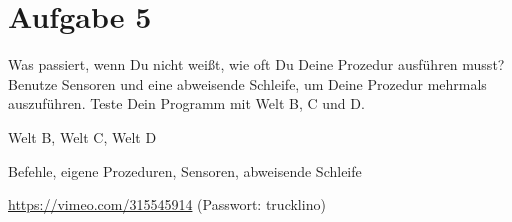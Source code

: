 \section{Aufgabe 5}
\label{sec:exercises:5}

Was passiert, wenn Du nicht weißt, wie oft Du Deine Prozedur ausführen musst? Benutze Sensoren und eine abweisende Schleife, um Deine Prozedur mehrmals auszuführen. Teste Dein Programm mit Welt B, C und D.

\begin{description}[noitemsep]
  \item[Welt wählen:] Welt B, Welt C, Welt D
  \item[Du brauchst:] Befehle, eigene Prozeduren, Sensoren, abweisende Schleife
  \item[Video:] \url{https://vimeo.com/315545914} (Passwort: trucklino)
\end{description}

